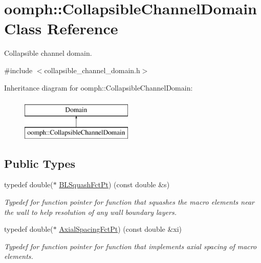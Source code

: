 \hypertarget{classoomph_1_1CollapsibleChannelDomain}{}\section{oomph\+:\+:Collapsible\+Channel\+Domain Class Reference}
\label{classoomph_1_1CollapsibleChannelDomain}


Collapsible channel domain.  




{\ttfamily \#include $<$collapsible\+\_\+channel\+\_\+domain.\+h$>$}

Inheritance diagram for oomph\+:\+:Collapsible\+Channel\+Domain\+:\begin{figure}[H]
\begin{center}
\leavevmode
\includegraphics[height=2.000000cm]{classoomph_1_1CollapsibleChannelDomain}
\end{center}
\end{figure}
\subsection*{Public Types}
\begin{DoxyCompactItemize}
\item 
typedef double($\ast$ \hyperlink{classoomph_1_1CollapsibleChannelDomain_a2bf1d7943bfac134a5c27a54c7e1faed}{B\+L\+Squash\+Fct\+Pt}) (const double \&s)
\begin{DoxyCompactList}\small\item\em Typedef for function pointer for function that squashes the macro elements near the wall to help resolution of any wall boundary layers. \end{DoxyCompactList}\item 
typedef double($\ast$ \hyperlink{classoomph_1_1CollapsibleChannelDomain_a317472dab112beac771ecf6442a465f5}{Axial\+Spacing\+Fct\+Pt}) (const double \&xi)
\begin{DoxyCompactList}\small\item\em Typedef for function pointer for function that implements axial spacing of macro elements. \end{DoxyCompactList}\end{DoxyCompactItemize}

